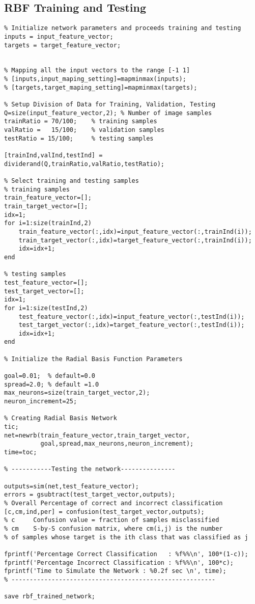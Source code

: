 \subsection*{RBF Training and Testing}
\begin{lstlisting}
% Initialize network parameters and proceeds training and testing
inputs = input_feature_vector;
targets = target_feature_vector;


% Mapping all the input vectors to the range [-1 1]
% [inputs,input_maping_setting]=mapminmax(inputs);
% [targets,target_maping_setting]=mapminmax(targets);

% Setup Division of Data for Training, Validation, Testing
Q=size(input_feature_vector,2); % Number of image samples
trainRatio = 70/100;    % training samples
valRatio =   15/100;    % validation samples
testRatio = 15/100;     % testing samples

[trainInd,valInd,testInd] = dividerand(Q,trainRatio,valRatio,testRatio);

% Select training and testing samples 
% training samples
train_feature_vector=[];
train_target_vector=[];
idx=1;
for i=1:size(trainInd,2)
	train_feature_vector(:,idx)=input_feature_vector(:,trainInd(i));
	train_target_vector(:,idx)=target_feature_vector(:,trainInd(i));
	idx=idx+1;
end

% testing samples
test_feature_vector=[];
test_target_vector=[];
idx=1;
for i=1:size(testInd,2)
	test_feature_vector(:,idx)=input_feature_vector(:,testInd(i));
	test_target_vector(:,idx)=target_feature_vector(:,testInd(i));
	idx=idx+1;
end

% Initialize the Radial Basis Function Parameters

goal=0.01;  % default=0.0
spread=2.0; % default =1.0
max_neurons=size(train_target_vector,2);
neuron_increment=25;

% Creating Radial Basis Network
tic;
net=newrb(train_feature_vector,train_target_vector,
		  goal,spread,max_neurons,neuron_increment);
time=toc;

% -----------Testing the network---------------

outputs=sim(net,test_feature_vector);
errors = gsubtract(test_target_vector,outputs);
% Overall Percentage of correct and incorrect classification
[c,cm,ind,per] = confusion(test_target_vector,outputs);
% c     Confusion value = fraction of samples misclassified
% cm	S-by-S confusion matrix, where cm(i,j) is the number
% of samples whose target is the ith class that was classified as j

fprintf('Percentage Correct Classification   : %f%%\n', 100*(1-c));
fprintf('Percentage Incorrect Classification : %f%%\n', 100*c);
fprintf('Time to Simulate the Network : %0.2f sec \n', time);
% --------------------------------------------------------

save rbf_trained_network;
\end{lstlisting}